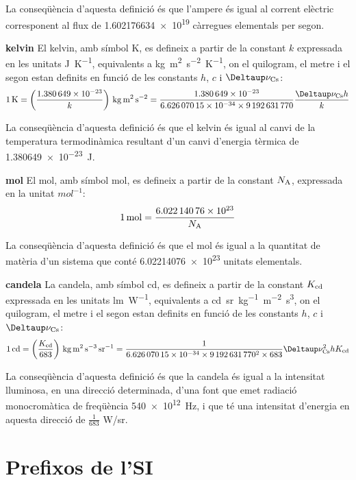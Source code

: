 \begin{list}{}
    La conseqüència d'aquesta definició és que l'ampere és igual al corrent elèctric corresponent al flux de \num{1,602176634 e19}  càrregues elementals per segon.

   \item[\textbf{kelvin}]  El kelvin, amb símbol K, es defineix a partir de la constant $k$ expressada en les unitats \unit{J.K^{-1}},  equivalents a \unit{kg.m^2.s^{-2}.K^{-1}},  on el quilogram, el metre i el segon estan definits en funció de les constants $h$, $c$ i $\Deltaup\nu\ped{Cs}$:
       \[
            \qty{1}{K} = \left(\frac{\num{1,380649e-23}}{k}\right)\unit{\,kg.m^2.s^{-2}} = \frac{\num{1,380649e-23}}{\num{6,62607015 e-34}\times\num{9192631770}} \frac{\Deltaup\nu\ped{Cs} h}{k}
       \]

    La conseqüència d'aquesta definició és que el kelvin és igual al canvi de la temperatura termodinàmica resultant d'un canvi d'energia tèrmica de \qty{1,380649e-23}{J}.

   \item[\textbf{mol}]  El mol, amb símbol mol, es defineix a partir de la constant $N_\mathrm{A}$, expressada en la unitat  $\unit{mol^{-1}}$:
       \[
            \qty{1}{mol} = \frac{\num{6,02214076 e23}}{N_\mathrm{A}}
       \]

    La conseqüència d'aquesta definició és que el mol és igual a la quantitat de matèria d'un sistema que conté
    \num{6,02214076 e23} unitats elementals.

   \item[\textbf{candela}] La candela, amb símbol cd, es defineix a partir de la constant $K_\mathrm{cd}$ expressada en les unitats \unit{lm.W^{-1}},  equivalents a \unit{cd.sr.kg^{-1}.m^{-2}.s^3},  on el quilogram, el metre i el segon estan definits en funció de les constants $h$, $c$ i $\Deltaup\nu\ped{Cs}$:
       \[
            \qty{1}{cd} = \left(\frac{K\ped{cd}}{683}\right)\unit{\,kg.m^2.s^{-3}.sr^{-1}} = \frac{1}{\num{6,62607015 e-34}\times\num{9192631770}^2\times 683} \Deltaup\nu\ped{Cs}^2 h K\ped{cd}
       \]

    La conseqüència d'aquesta definició és que la candela és igual a la intensitat lluminosa, en una direcció determinada,   d'una font que emet radiació monocromàtica de freqüència \qty{540e12}{Hz}, i
   que té una intensitat d'energia en aquesta direcció de $\frac{1}{683}$ \unit{W/sr}.
\end{list}


\section{Prefixos de l'SI}

